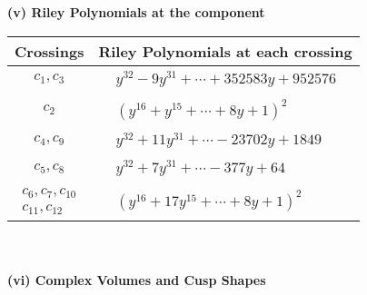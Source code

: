\documentclass[1p]{elsarticle_modified}
\theoremstyle{definition}
\begin{document}
\flushleft \textbf{(v) Riley Polynomials at the component}\newline \\
\begin{tabular}{m{50pt}|m{274pt}}
Crossings & \hspace{64pt}Riley Polynomials at each crossing \\
\hline $$\begin{aligned}c_{1},c_{3}\end{aligned}$$&$\begin{aligned}
&y^{32}-9 y^{31}+\cdots+352583 y+952576
\end{aligned}$\\
\hline $$\begin{aligned}c_{2}\end{aligned}$$&$\begin{aligned}
&(y^{16}+y^{15}+\cdots+8 y+1)^{2}
\end{aligned}$\\
\hline $$\begin{aligned}c_{4},c_{9}\end{aligned}$$&$\begin{aligned}
&y^{32}+11 y^{31}+\cdots-23702 y+1849
\end{aligned}$\\
\hline $$\begin{aligned}c_{5},c_{8}\end{aligned}$$&$\begin{aligned}
&y^{32}+7 y^{31}+\cdots-377 y+64
\end{aligned}$\\
\hline $$\begin{aligned}c_{6},c_{7},c_{10}\\c_{11},c_{12}\end{aligned}$$&$\begin{aligned}
&(y^{16}+17 y^{15}+\cdots+8 y+1)^{2}
\end{aligned}$\\
\hline
\end{tabular}\\~\\
\newpage\flushleft \textbf{(vi) Complex Volumes and Cusp Shapes}
\end{document}
